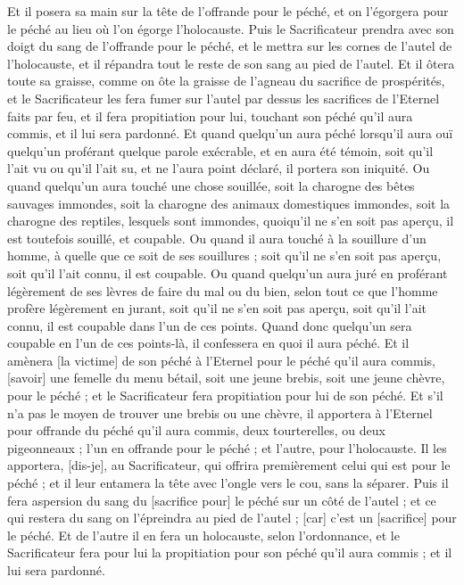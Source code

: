 \begin{multicols}{2}
Et il posera sa main sur la tête de l'offrande pour le péché, et on l'égorgera pour le péché au lieu où l'on égorge l'holocauste.
Puis le Sacrificateur prendra avec son doigt du sang de l'offrande pour le péché, et le mettra sur les cornes de l'autel de l'holocauste, et il répandra tout le reste de son sang au pied de l'autel.
Et il ôtera toute sa graisse, comme on ôte la graisse de l'agneau du sacrifice de prospérités, et le Sacrificateur les fera fumer sur l'autel par dessus les sacrifices de l'Eternel faits par feu, et il fera propitiation pour lui, touchant son péché qu'il aura commis, et il lui sera pardonné.
\VerseOne{}Et quand quelqu'un aura péché lorsqu'il aura ouï quelqu'un proférant quelque parole exécrable, et en aura été témoin, soit qu'il l'ait vu ou qu'il l'ait su, et ne l'aura point déclaré, il portera son iniquité.
Ou quand quelqu'un aura touché une chose souillée, soit la charogne des bêtes sauvages immondes, soit la charogne des animaux domestiques immondes, soit la charogne des reptiles, lesquels sont immondes, quoiqu'il ne s'en soit pas aperçu, il est toutefois souillé, et coupable.
Ou quand il aura touché à la souillure d'un homme, à quelle que ce soit de ses souillures ; soit qu'il ne s'en soit pas aperçu, soit qu'il l'ait connu, il est coupable.
Ou quand quelqu'un aura juré en proférant légèrement de ses lèvres de faire du mal ou du bien, selon tout ce que l'homme profère légèrement en jurant, soit qu'il ne s'en soit pas aperçu, soit qu'il l'ait connu, il est coupable dans l'un de ces points.
Quand donc quelqu'un sera coupable en l'un de ces points-là, il confessera en quoi il aura péché.
Et il amènera [la victime] de son péché à l'Eternel pour le péché qu'il aura commis, [savoir] une femelle du menu bétail, soit une jeune brebis, soit une jeune chèvre, pour le péché ; et le Sacrificateur fera propitiation pour lui de son péché.
Et s'il n'a pas le moyen de trouver une brebis ou une chèvre, il apportera à l'Eternel pour offrande du péché qu'il aura commis, deux tourterelles, ou deux pigeonneaux ; l'un en offrande pour le péché ; et l'autre, pour l'holocauste.
Il les apportera, [dis-je], au Sacrificateur, qui offrira premièrement celui qui est pour le péché ; et il leur entamera la tête avec l'ongle vers le cou, sans la séparer.
Puis il fera aspersion du sang du [sacrifice pour] le péché sur un côté de l'autel ; et ce qui restera du sang on l'épreindra au pied de l'autel ; [car] c'est un [sacrifice] pour le péché.
Et de l'autre il en fera un holocauste, selon l'ordonnance, et le Sacrificateur fera pour lui la propitiation pour son péché qu'il aura commis ; et il lui sera pardonné.

\end{multicols}
